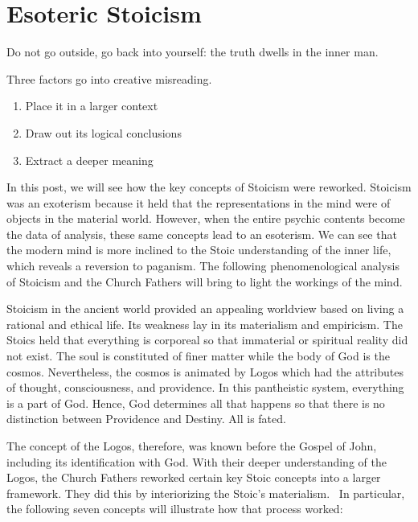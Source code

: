 \section{Esoteric Stoicism}

\begin{quotex}
Do not go outside, go back into yourself: the truth dwells in the inner man. 

\end{quotex}
Three factors go into creative misreading.

\begin{enumerate}
\item Place it in a larger context 
\item Draw out its logical conclusions 
\item Extract a deeper meaning 
\end{enumerate}
In this post, we will see how the key concepts of Stoicism were reworked. Stoicism was an exoterism because it held that
the representations in the mind were of objects in the material world. However, when the entire psychic contents become
the data of analysis, these same concepts lead to an esoterism. We can see that the modern mind is more inclined to the
Stoic understanding of the inner life, which reveals a reversion to paganism. The following phenomenological analysis
of Stoicism and the Church Fathers will bring to light the workings of the mind.

Stoicism in the ancient world provided an appealing worldview based on living a rational and ethical life. Its weakness
lay in its materialism and empiricism. The Stoics held that everything is corporeal so that immaterial or spiritual
reality did not exist. The soul is constituted of finer matter while the body of God is the cosmos. Nevertheless, the
cosmos is animated by Logos which had the attributes of thought, consciousness, and providence. In this pantheistic
system, everything is a part of God. Hence, God determines all that happens so that there is no distinction between
Providence and Destiny. All is fated.

The concept of the Logos, therefore, was known before the Gospel of John, including its identification with God. With
their deeper understanding of the Logos, the Church Fathers reworked certain key Stoic concepts into a larger
framework. They did this by interiorizing the Stoic’s materialism.  In particular, the following seven
concepts will illustrate how that process worked:

